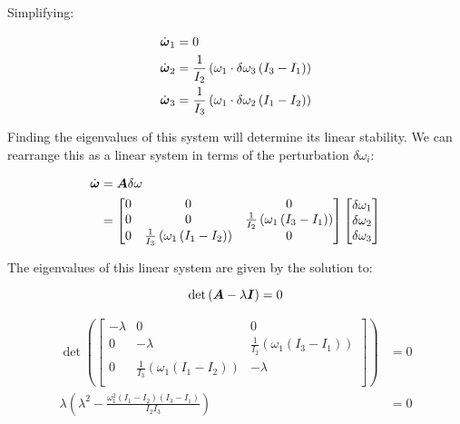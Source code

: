 Simplifying:

\begin{align*}
    \dot{\boldsymbol{\omega}}_1 &= 0 \\
    \dot{\boldsymbol{\omega}}_2 &= \frac{1}{I_2} \left(\omega_1 \cdot \delta\omega_3 \left(I_3 - I_1\right) \right)\\
    \dot{\boldsymbol{\omega}}_3 &= \frac{1}{I_3} \left(\omega_1 \cdot \delta\omega_2 \left(I_1 - I_2\right) \right)\\
\end{align*}

Finding the eigenvalues of this system will determine its linear stability. We can rearrange this as a linear system in terms of the perturbation $\delta \omega_i$:

\begin{align*}
    \dot{\boldsymbol{\omega}} &= \boldsymbol{A} \delta \omega \\
    &= \begin{bmatrix}
        0 & 0 & 0 \\
        0 & 0 & \frac{1}{I_2} \left(\omega_1 \left(I_3 - I_1\right) \right)\\
        0 & \frac{1}{I_3} \left(\omega_1 \left(I_1 - I_2\right) \right) & 0 \\
    \end{bmatrix}
    \begin{bmatrix} \delta\omega_1 \\ \delta\omega_2 \\ \delta\omega_3 \end{bmatrix}
\end{align*}

The eigenvalues of this linear system are given by the solution to:

\begin{equation}
    \det\left(\boldsymbol{A} - \lambda \boldsymbol{I}\right) = 0
\end{equation}

\begin{align*}
    \det\left(\begin{bmatrix}
        -\lambda & 0 & 0 \\
        0 & -\lambda & \frac{1}{I_2} \left(\omega_1 \left(I_3 - I_1\right) \right)\\
        0 & \frac{1}{I_3} \left(\omega_1 \left(I_1 - I_2\right) \right) & -\lambda \\
    \end{bmatrix}\right) &= 0 \\
    \lambda \left( \lambda^2 - \frac{\omega_1^2 \left(I_1 - I_2\right) \left(I_3 - I_1\right)}{I_2 I_3} \right) &= 0 \\
\end{align*}

